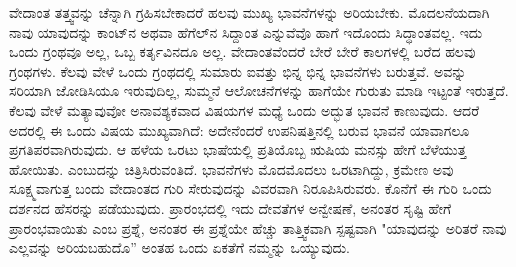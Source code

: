 ವೇದಾಂತ ತತ್ತ್ವವನ್ನು ಚೆನ್ನಾಗಿ ಗ್ರಹಿಸಬೇಕಾದರೆ ಹಲವು ಮುಖ್ಯ ಭಾವನೆಗಳನ್ನು ಅರಿಯಬೇಕು. ಮೊದಲನೆಯದಾಗಿ ನಾವು ಯಾವುದನ್ನು ಕಾಂಟ್‌ನ ಅಥವಾ ಹೆಗೆಲ್‌ನ ಸಿದ್ದಾಂತ ಎನ್ನುವೆವೊ ಹಾಗೆ ಇದೊಂದು ಸಿದ್ಧಾಂತವಲ್ಲ. ಇದು ಒಂದು ಗ್ರಂಥವೂ ಅಲ್ಲ, ಒಬ್ಬ ಕರ್ತೃವಿನದೂ ಅಲ್ಲ. ವೇದಾಂತವೆಂದರೆ ಬೇರೆ ಬೇರೆ ಕಾಲಗಳಲ್ಲಿ ಬರೆದ ಹಲವು ಗ್ರಂಥಗಳು. ಕೆಲವು ವೇಳೆ ಒಂದು ಗ್ರಂಥದಲ್ಲಿ ಸುಮಾರು ಐವತ್ತು ಭಿನ್ನ ಭಿನ್ನ ಭಾವನೆಗಳು ಬರುತ್ತವೆ. ಅವನ್ನು ಸರಿಯಾಗಿ ಜೋಡಿಸಿಯೂ ಇರುವುದಿಲ್ಲ, ಸುಮ್ಮನೆ ಆಲೋಚನೆಗಳನ್ನು ಹಾಗೆಯೇ ಗುರುತು ಮಾಡಿ ಇಟ್ಟಂತೆ ಇರುತ್ತದೆ. ಕೆಲವು ವೇಳೆ ಮತ್ಯಾವುವೋ ಅನಾವಶ್ಯಕವಾದ ವಿಷಯಗಳ ಮಧ್ಯೆ ಒಂದು ಅದ್ಭುತ ಭಾವನೆ ಕಾಣುವುದು. ಆದರೆ ಅದರಲ್ಲಿ ಈ ಒಂದು ವಿಷಯ ಮುಖ್ಯವಾಗಿದೆ: ಅದೇನೆಂದರೆ ಉಪನಿಷತ್ತಿನಲ್ಲಿ ಬರುವ ಭಾವನೆ ಯಾವಾಗಲೂ ಪ್ರಗತಿಪರವಾಗಿರುವುದು. ಆ ಹಳೆಯ ಒರಟು ಭಾಷೆಯಲ್ಲಿ ಪ್ರತಿಯೊಬ್ಬ ಋಷಿಯ ಮನಸ್ಸು ಹೇಗೆ ಬೆಳೆಯುತ್ತ ಹೋಯಿತು. ಎಂಬುದನ್ನು ಚಿತ್ರಿಸಿರುವಂತಿದೆ. ಭಾವನೆಗಳು ಮೊದಮೊದಲು ಒರಟಾಗಿದ್ದು, ಕ್ರಮೇಣ ಅವು ಸೂಕ್ಷ್ಮವಾಗುತ್ತ ಬಂದು ವೇದಾಂತದ ಗುರಿ ಸೇರುವುದನ್ನು ವಿವರವಾಗಿ ನಿರೂಪಿಸಿರುವರು. ಕೊನೆಗೆ ಈ ಗುರಿ ಒಂದು ದರ್ಶನದ ಹೆಸರನ್ನು ಪಡೆಯುವುದು. ಪ್ರಾರಂಭದಲ್ಲಿ ಇದು ದೇವತೆಗಳ ಅನ್ವೇಷಣೆ, ಅನಂತರ ಸೃಷ್ಟಿ ಹೇಗೆ ಪ್ರಾರಂಭವಾಯಿತು ಎಂಬ ಪ್ರಶ್ನೆ, ಅನಂತರ ಈ ಪ್ರಶ್ನೆಯೇ ಹೆಚ್ಚು ತಾತ್ತ್ವಿಕವಾಗಿ ಸ್ಪಷ್ಟವಾಗಿ "ಯಾವುದನ್ನು ಅರಿತರೆ ನಾವು ಎಲ್ಲವನ್ನು ಅರಿಯಬಹುದೊ” ಅಂತಹ ಒಂದು ಏಕತೆಗೆ ನಮ್ಮನ್ನು ಒಯ್ಯುವುದು.

